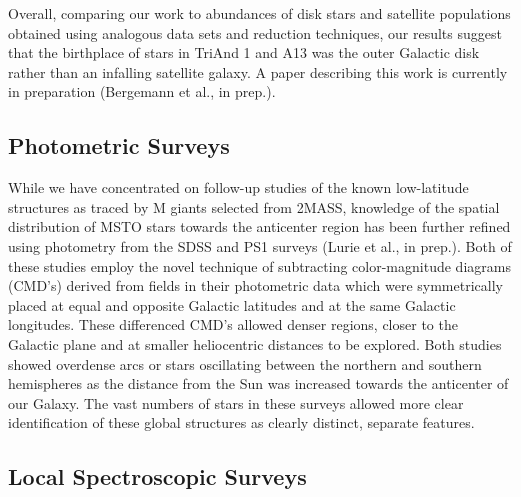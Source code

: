 \documentclass[galaxies,article,submit,moreauthors,pdftex,10pt,a4paper]{mdpi}
\begin{document}
Overall, comparing our work to abundances of disk stars and satellite populations obtained using analogous data sets and reduction techniques, our results suggest that the birthplace of stars in TriAnd 1 and A13 was the outer Galactic disk rather than an infalling satellite galaxy.
A paper describing this work is currently in preparation (Bergemann et al., in prep.).


\subsection{Photometric Surveys}

While we have concentrated on follow-up studies of the known low-latitude structures as traced by M giants selected from 2MASS, knowledge of the spatial distribution of MSTO stars towards the anticenter region has been further refined using photometry from the SDSS \cite{xu15} and PS1 surveys (Lurie et al., in prep.).
Both of these studies employ the novel technique of subtracting color-magnitude diagrams (CMD's) derived from fields in their photometric data which were symmetrically placed at equal and opposite Galactic latitudes and at the same Galactic longitudes.
These differenced CMD's allowed denser regions, closer to the Galactic plane and at smaller heliocentric distances  to be explored.
Both studies showed overdense arcs or stars oscillating between the northern and southern hemispheres as the distance from the Sun was increased towards the anticenter of our Galaxy.
The vast numbers of stars in these surveys allowed more clear identification of these global structures as clearly distinct, separate features.





\subsection{Local Spectroscopic Surveys}
\end{document}
